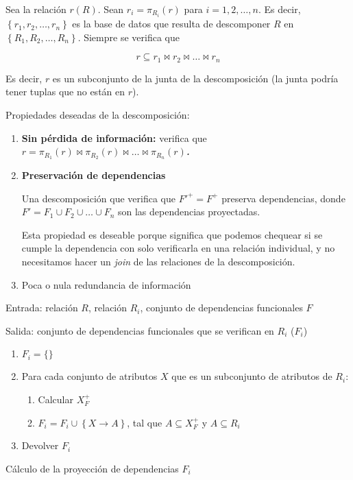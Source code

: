 \documentclass[a4paper, twoside]{article}
\begin{document}
Sea la relación $r(R)$. Sean $r_{i}=\pi_{R_{i}}(r)$ para $i=1,2,\dots,n$.
Es decir, $\left\{ r_{1},r_{2},\dots,r_{n}\right\} $ es la base de
datos que resulta de descomponer $R$ en $\left\{ R_{1},R_{2},\dots,R_{n}\right\} $.
Siempre se verifica que

\[
r\subseteq r_{1}\bowtie r_{2}\bowtie\dots\bowtie r_{n}
\]


Es decir, $r$ es un subconjunto de la junta de la descomposición
(la junta podría tener tuplas que no están en $r$).

Propiedades deseadas de la descomposición:
\begin{enumerate}
\item \textbf{Sin pérdida de información: }verifica que\textbf{ }\textbf{\emph{$r=\pi_{R_{1}}(r)\bowtie\pi_{R_{2}}(r)\bowtie\dots\bowtie\pi_{R_{n}}(r)$. }}
\item \textbf{Preservación de dependencias}


Una descomposición que verifica que $F'^{+}=F^{+}$ preserva dependencias,
donde $F'=F_{1}\cup F_{2}\cup\dots\cup F_{n}$ son las dependencias
proyectadas.


Esta propiedad es deseable porque significa que podemos chequear si
se cumple la dependencia con solo verificarla en una relación individual,
y no necesitamos hacer un \emph{join} de las relaciones de la descomposición.

\item Poca o nula redundancia de información
\end{enumerate}
\begin{algorithm}[H]
Entrada: relación $R$, relación $R_{i}$, conjunto de dependencias
funcionales $F$

Salida: conjunto de dependencias funcionales que se verifican en $R_{i}$
($F_{i}$)
\begin{enumerate}
\item $F_{i}=\{\}$
\item Para cada conjunto de atributos $X$ que es un subconjunto de atributos
de $R_{i}$:

\begin{enumerate}
\item Calcular $X_{F}^{+}$
\item $F_{i}=F_{i}\cup\left\{ X\to A\right\} $, tal que $A\subseteq X_{F}^{+}$
y $A\subseteq R_{i}$
\end{enumerate}
\item Devolver $F_{i}$
\end{enumerate}
\protect\caption{Cálculo de la proyección de dependencias $F_{i}$}


\end{algorithm}
\end{document}

